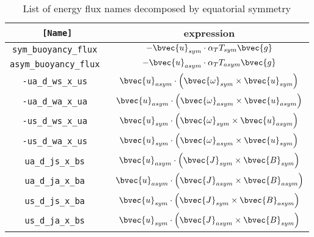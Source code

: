 \begin{table}[htp]
\caption{List of energy flux names decomposed by equatorial symmetry}
\begin{center}
\begin{tabular}{|c|c|}
\hline
{\tt [Name]} & expression  \\ \hline
\tt sym\_buoyancy\_flux &  $ - \bvec{u}_{sym}  \cdot  \alpha_{T} T_{sym} \bvec{g}  $ \\
\tt asym\_buoyancy\_flux  &  $ - \bvec{u}_{asym}  \cdot  \alpha_{T} T_{asym} \bvec{g}  $ \\ \hline
%
\tt -ua\_d\_ws\_x\_us &  $  \bvec{u}_{asym} \cdot \left( \bvec{\omega}_{sym} \times \bvec{u}_{sym} \right)$ \\
\tt -ua\_d\_wa\_x\_ua  &  $ \bvec{u}_{asym} \cdot  \left( \bvec{\omega}_{asym} \times \bvec{u}_{asym} \right)$ \\
\tt -us\_d\_ws\_x\_ua  &  $ \bvec{u}_{sym} \cdot  \left( \bvec{\omega}_{sym} \times \bvec{u}_{asym} \right)$ \\
\tt -us\_d\_wa\_x\_us &  $ \bvec{u}_{sym} \cdot  \left( \bvec{\omega}_{asym} \times \bvec{u}_{sym} \right)$ \\ \hline
%
\tt ua\_d\_js\_x\_bs  &  $ \bvec{u}_{asym} \cdot \left(\bvec{J}_{sym} \times \bvec{B}_{sym} \right) $ \\
\tt ua\_d\_ja\_x\_ba  &  $ \bvec{u}_{asym}  \cdot  \left(\bvec{J}_{asym} \times \bvec{B}_{asym} \right) $ \\
\tt us\_d\_js\_x\_ba  &  $ \bvec{u}_{sym}  \cdot  \left(\bvec{J}_{sym} \times \bvec{B}_{asym} \right) $ \\
\tt us\_d\_ja\_x\_bs  &  $ \bvec{u}_{sym}  \cdot  \left(\bvec{J}_{asym} \times \bvec{B}_{sym} \right) $ \\ \hline
%
\end{tabular}
\end{center}
\label{table:energy_flux_sym}
\end{table}
%
%

